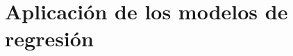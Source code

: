 \documentclass{beamer}
\begin{document}

\section{Aplicación de los modelos de regresión }
\end{document}
